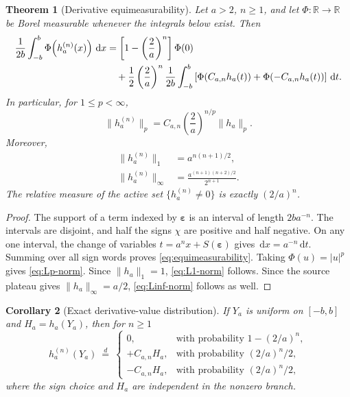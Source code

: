 \documentclass[11pt]{article}
\newtheorem{theorem}{Theorem}[section]
\newtheorem{corollary}[theorem]{Corollary}
\theoremstyle{definition}
\theoremstyle{remark}
\newcommand{\R}{\mathbb{R}}
\newcommand{\dd}{\,\mathrm{d}}
\begin{document}
\begin{theorem}[Derivative equimeasurability]
\label{thm:equimeasurability}
Let \(a>2\), \(n\ge1\), and let \(\Phi:\R\to\R\) be Borel measurable whenever the integrals below exist.  Then
\begin{align}
 \frac1{2b}\int_{-b}^{b}\Phi\!\left(h_a^{(n)}(x)\right)\dd x
 &=\left[1-\left(\frac2a\right)^n\right]\Phi(0)
 \notag\\
 &\quad+\frac12\left(\frac2a\right)^n
  \frac1{2b}\int_{-b}^{b}
   \left[\Phi(C_{a,n}h_a(t))+\Phi(-C_{a,n}h_a(t))\right]\dd t.
 \label{eq:equimeasurability}
\end{align}
In particular, for \(1\le p<\infty\),
\begin{equation}
  \boxed{\quad
  \|h_a^{(n)}\|_p=C_{a,n}\left(\frac2a\right)^{n/p}\|h_a\|_p.
  \quad}
  \label{eq:Lp-norm}
\end{equation}
Moreover,
\begin{align}
  \|h_a^{(n)}\|_1&=a^{n(n+1)/2},
  \label{eq:L1-norm}\\
  \|h_a^{(n)}\|_\infty
  &=\frac{a^{(n+1)(n+2)/2}}{2^{n+1}}.
  \label{eq:Linf-norm}
\end{align}
The relative measure of the active set \(\{h_a^{(n)}\ne0\}\) is exactly \((2/a)^n\).
\end{theorem}

\begin{proof}
The support of a term indexed by \(\boldsymbol\varepsilon\) is an interval of length \(2ba^{-n}\).  The intervals are disjoint, and half the signs \(\chi\) are positive and half negative.  On any one interval, the change of variables
\(t=a^nx+S(\boldsymbol\varepsilon)\) gives \(\dd x=a^{-n}\dd t\).  Summing over all sign words proves \eqref{eq:equimeasurability}.  Taking \(\Phi(u)=|u|^p\) gives \eqref{eq:Lp-norm}.  Since \(\|h_a\|_1=1\), \eqref{eq:L1-norm} follows.  Since the source plateau gives \(\|h_a\|_\infty=a/2\), \eqref{eq:Linf-norm} follows as well.
\end{proof}

\begin{corollary}[Exact derivative-value distribution]
If \(Y_a\) is uniform on \([-b,b]\) and \(H_a=h_a(Y_a)\), then for \(n\ge1\)
\begin{equation}
 h_a^{(n)}(Y_a)\ \overset d=\
 \begin{cases}
  0, &\text{with probability }1-(2/a)^n,\\
  +C_{a,n}H_a, &\text{with probability }(2/a)^n/2,\\
  -C_{a,n}H_a, &\text{with probability }(2/a)^n/2,
 \end{cases}
 \label{eq:derivative-mixture-law}
\end{equation}
where the sign choice and \(H_a\) are independent in the nonzero branch.
\end{corollary}
\end{document}
